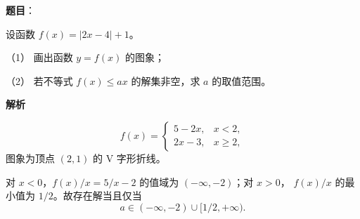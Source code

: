 \begin{answer}

\textbf{题目}：

设函数 $f(x)=|2x-4|+1$。

（1） 画出函数 $y=f(x)$ 的图象；

（2） 若不等式 $f(x)\leq ax$ 的解集非空，求 $a$ 的取值范围。
\nopagebreak[4]
\begin{center}\end{center}
\nopagebreak[4]
\textbf{解析}


\nopagebreak[4]
\[
f(x)=\begin{cases}5-2x,&x<2,\\2x-3,&x\geq2,\end{cases}
\]
图象为顶点 $(2,1)$ 的 V 字形折线。


对 $x<0$，$f(x)/x=5/x-2$ 的值域为 $(-\infty,-2)$；对 $x>0$，
$f(x)/x$ 的最小值为 $1/2$。故存在解当且仅当
\nopagebreak[4]
\[a\in(-\infty,-2)\cup[1/2,+\infty).\]


\gkanswer{答案（2）：$a\in(-\infty,-2)\cup\left[\dfrac12,+\infty\right)$。}

\end{answer}